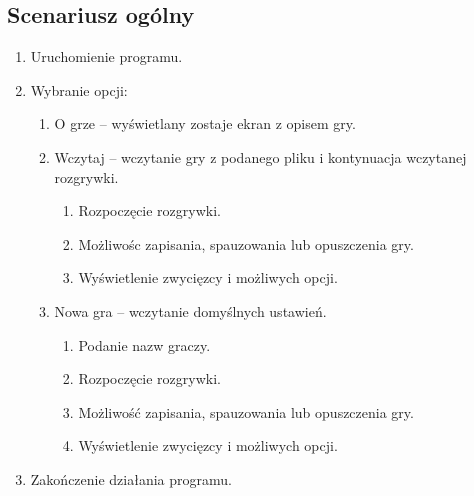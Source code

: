 \documentclass[a4paper]{article}
\begin{document}
\subsection{Scenariusz ogólny}
\begin{enumerate}
    \item Uruchomienie programu.
    \item Wybranie opcji:
    \begin{enumerate}
        \item O grze -- wyświetlany zostaje ekran z opisem gry.
        \item Wczytaj -- wczytanie gry z podanego pliku i kontynuacja wczytanej rozgrywki.
        \begin{enumerate}
            \item Rozpoczęcie rozgrywki.
            \item Możliwośc zapisania, spauzowania lub opuszczenia gry.
            \item Wyświetlenie zwycięzcy i możliwych opcji.
        \end{enumerate}
        \item Nowa gra -- wczytanie domyślnych ustawień.
        \begin{enumerate}
            \item Podanie nazw graczy.
            \item Rozpoczęcie rozgrywki.
            \item Możliwość zapisania, spauzowania lub opuszczenia gry.
            \item Wyświetlenie zwycięzcy i możliwych opcji.
        \end{enumerate}
    \end{enumerate}
    \item Zakończenie działania programu.
\end{enumerate}
\end{document}
